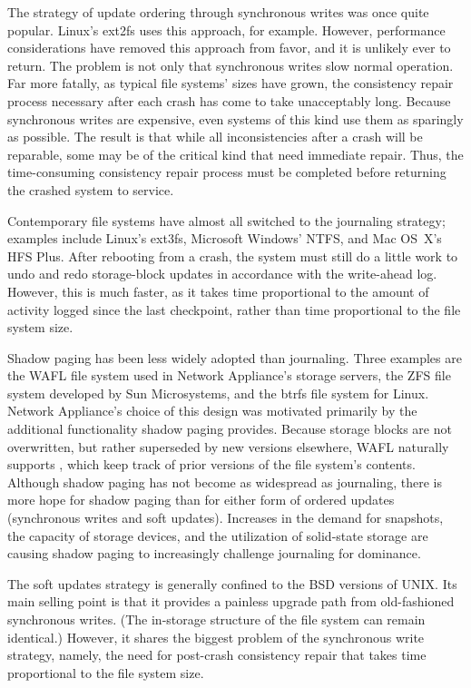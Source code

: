 The strategy of update ordering through synchronous writes was once
quite popular.  Linux's ext2fs uses this approach, for example.  However,
performance considerations have removed this approach from favor, and
it is unlikely ever to return.  The problem is not only that
synchronous writes slow normal operation.  Far more fatally, as
typical file systems' sizes have grown, the consistency repair process
necessary after each crash has come to take unacceptably long.  Because
synchronous writes are expensive, even systems of this kind use them
as sparingly as possible.  The result is that while all
inconsistencies after a crash will be reparable, some may be of the
critical kind that need immediate repair.  Thus, the time-consuming
consistency repair process must be completed before returning the crashed system to
service.

Contemporary file systems have almost all switched to the journaling
strategy; examples include Linux's ext3fs, Microsoft Windows' NTFS,
and Mac OS~X's HFS Plus.  After rebooting from a crash, the system
must still do a little work to undo and redo storage-block updates in
accordance with the write-ahead log.  However, this is much faster, as
it takes time
proportional to the amount of activity logged since the last
checkpoint, rather than time proportional to the file system size.

Shadow paging has been less widely adopted than journaling.  Three
examples are the WAFL file system used in Network Appliance's storage
servers, the ZFS file system developed by Sun Microsystems, and the
btrfs file system for Linux.  Network Appliance's choice of this design was motivated
primarily by the additional functionality shadow paging provides.  Because
storage blocks are not overwritten, but rather superseded by new versions
elsewhere, WAFL naturally supports
, which keep track of prior versions of the file
system's contents. 
Although shadow paging has not become as widespread as journaling, there is more hope for shadow paging than for either form
of ordered updates (synchronous writes and soft updates).  Increases in the demand
for snapshots, the capacity of storage devices, and the utilization of
solid-state storage are causing shadow paging to increasingly challenge
journaling for dominance.

The soft updates strategy is
generally confined to the BSD versions of UNIX.  Its main selling
point is that it provides a painless upgrade path from old-fashioned
synchronous writes.  (The in-storage structure of the file system can
remain identical.)  However, it shares the biggest problem of the
synchronous write strategy, namely, the need for post-crash consistency
repair that takes time proportional to the file system size.

